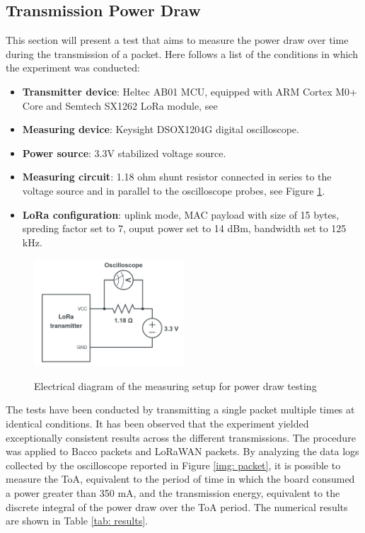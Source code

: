 \subsection{Transmission Power Draw}
This section will present a test that aims to measure the power draw over time during the transmission of a packet.
Here follows a list of the conditions in which the experiment was conducted:
\begin{itemize}
    \item \textbf{Transmitter device}: Heltec AB01 MCU, equipped with ARM Cortex M0+ Core and Semtech SX1262 LoRa module,
        see \cite{ab01}
    \item \textbf{Measuring device}: Keysight DSOX1204G digital oscilloscope.
    \item \textbf{Power source}: 3.3V stabilized voltage source.
    \item \textbf{Measuring circuit}: 1.18 ohm shunt resistor connected in series to the voltage source
        and in parallel to the oscilloscope probes, see Figure \ref{img: measure setup}.
    \item \textbf{LoRa configuration}: uplink mode, MAC payload with size of 15 bytes, spreding factor set to 7, ouput power
        set to 14 dBm, bandwidth set to 125 kHz.
\end{itemize}
\begin{figure}[ht]
    \centering
    \includegraphics[width=0.5\textwidth]{images/schematic.png}\\
    \caption{Electrical diagram of the measuring setup for power draw testing}
    \label{img: measure setup}
\end{figure}
The tests have been conducted by transmitting a single packet multiple times at identical conditions. It has been observed
that the experiment yielded exceptionally consistent results across the different transmissions. The procedure was
applied to Bacco packets and LoRaWAN packets. By analyzing the data logs collected by the oscilloscope reported in
Figure \ref{img: packet}, it is possible to measure the \gls{ToA}, equivalent to the period of time in which the board
consumed a power greater than 350 mA, and the transmission energy, equivalent to the discrete integral of the power draw
over the \gls{ToA} period. The numerical results are shown in Table \ref{tab: results}.

